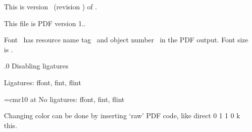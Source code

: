 This is version \the\pdftexversion\ (revision \pdftexrevision) of \pdfTeX.


This file is PDF version 1.\the\pdfminorversion.
\bigskip


Font \fontname\font\ has resource name tag
\pdffontname\font\ and object number \pdffontobjnum\font\ in the PDF output.
Font size is \pdffontsize\font.\par

.0 {Disabling ligatures}

Ligatures: ffont, fint, flint\par
{\font\noli=cmr10 at\pdffontsize\font
 \pdfnoligatures\noli No ligatures: ffont, fint, flint}
\bigskip

\endfeature


\pdfincludechars{}


Changing color can be done by inserting `raw' PDF code, like
\pdfliteral direct {0 1 1 0 k} %
this.


